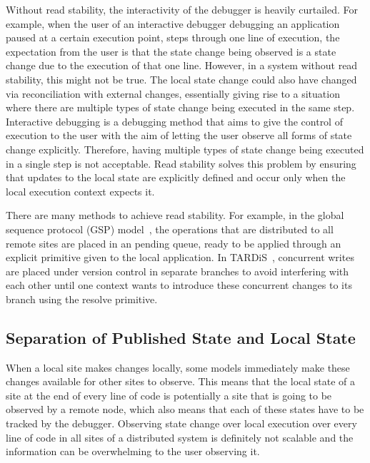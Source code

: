 Without read stability, the interactivity of the debugger is heavily curtailed. For example, when the user of an interactive debugger debugging an application paused at a certain execution point, steps through one line of execution, the expectation from the user is that the state change being observed is a state change due to the execution of that one line. However, in a system without read stability, this might not be true. The local state change could also have changed via reconciliation with external changes, essentially giving rise to a situation where there are multiple types of state change being executed in the same step. Interactive debugging is a debugging method that aims to give the control of execution to the user with the aim of letting the user observe all forms of state change explicitly. Therefore, having multiple types of state change being executed in a single step is not acceptable. Read stability solves this problem by ensuring that updates to the local state are explicitly defined and occur only when the local execution context expects it.

There are many methods to achieve read stability. For example, in the global sequence protocol (GSP) model~\cite{gsp1, gsp}, the operations that are distributed to all remote sites are placed in an pending queue, ready to be applied through an explicit primitive given to the local application. In TARDiS~\cite{tardis}, concurrent writes are placed under version control in separate branches to avoid interfering with each other until one context wants to introduce these concurrent changes to its branch using the resolve primitive. 


\subsection{Separation of Published State and Local State}
When a local site makes changes locally, some models immediately make these changes available for other sites to observe. This means that the local state of a site at the end of every line of code is potentially a site that is going to be observed by a remote node, which also means that each of these states have to be tracked by the debugger. Observing state change over local execution over every line of code in all sites of a distributed system is definitely not scalable and the information can be overwhelming to the user observing it.

